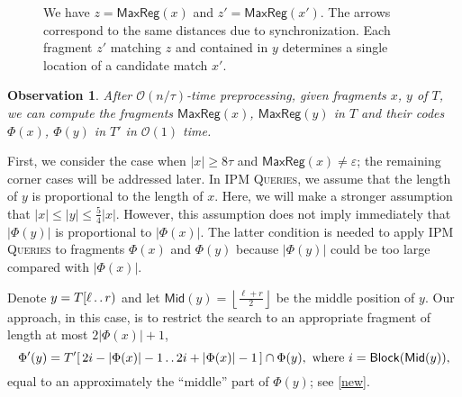 \documentclass[a4paper]{article}
\newtheorem{observation}[theorem]{Observation}
\theoremstyle{definition}
\theoremstyle{remark}
\newcommand{\IPM}{\textsc{IPM Queries}\xspace}
\newcommand{\floor}[1]{\left\lfloor #1 \right\rfloor}
\newcommand{\dd}{\mathinner{\ldotp\ldotp}}
\newcommand{\MaxReg}{\mathsf{MaxReg}}
\newcommand{\Mid}{\mathsf{Mid}}
\newcommand{\Oh}{\mathcal{O}}
\newcommand{\BLOCK}{\mathsf{Block}}
\begin{document}
\begin{figure}[h]
  
  
  \caption{We have $z=\MaxReg(x)$ and $z'=\MaxReg(x')$.
The arrows correspond to the same distances due to synchronization. Each fragment $z'$ matching $z$ and contained in $y$ determines a single location of a candidate match $x'$.}\label{fig:zz1}
\end{figure}

\begin{observation}
After $\Oh(n/\tau)$-time preprocessing, given fragments $x$, $y$ of $T$,
we can compute the fragments $\MaxReg(x)$, $\MaxReg(y)$ in $T$ and 
their codes $\Phi(x)$, $\Phi(y)$ in $T'$ in $\Oh(1)$ time.
\end{observation}

First, we consider the case when $|x| \ge 8\tau$ and $\MaxReg(x)\ne \varepsilon$; the remaining corner cases will be addressed later.
In \IPM, we assume that the length of $y$ is proportional to the length of $x$. 
Here, we will make a stronger assumption that $|x| \le |y| \le \frac54|x|$. 
However, this assumption does not imply immediately that $|\Phi(y)|$ is proportional to $|\Phi(x)|$.
The latter condition is needed to apply \IPM to fragments $\Phi(x)$ and $\Phi(y)$ because $|\Phi(y)|$ could be too large compared with $|\Phi(x)|$.

Denote $y=T[\ell\dd r)$ and let $\Mid(y)=\floor{\frac{\ell+r}{2}}$ be the middle position of $y$.
Our approach, in this case, is to restrict the search to 
an appropriate fragment of length at most $2|\Phi(x)|+1$,
\[\Phi'(y)=T'[\,2i-|\Phi(x)|-1\dd 2i+|\Phi(x)|-1\,] \cap \Phi(y),\ \text{where}\ i=\BLOCK(\Mid(y)),\]
equal to an approximately the ``middle'' part of $\Phi(y)$; see \cref{new}.
\end{document}
